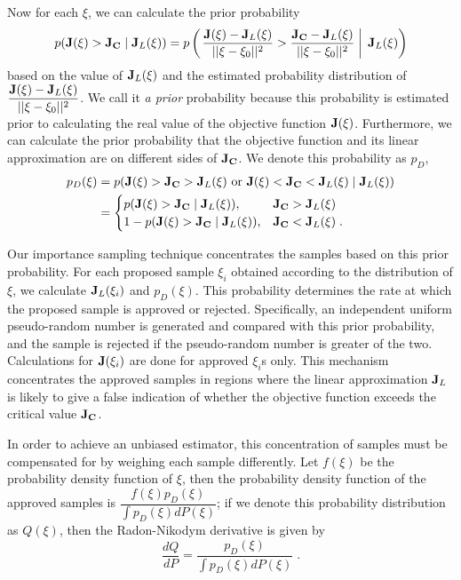 Now for each $\xi$, we can calculate the prior probability
\[ p({\bf J}(\xi) > {\bf J_C} \;|\; {\bf J}_L(\xi))
 = p\left( \left.\dfrac{{\bf J}(\xi) - {\bf J}_L(\xi)}{||\xi - \xi_0||^2}
   > \dfrac{{\bf J_C} - {\bf J}_L(\xi)}{||\xi - \xi_0||^2} \;\right|\;
   {\bf J}_L(\xi) \right) \] 
based on the value of ${\bf J}_L(\xi)$ and the estimated probability
distribution
of $\dfrac{{\bf J}(\xi) - {\bf J}_L(\xi)}{||\xi - \xi_0||^2}$.
We call it {\it a prior}
probability because this probability is estimated prior to
calculating the real value of the objective function ${\bf J}(\xi)$.
Furthermore, we can calculate the prior probability that the objective
function and its linear approximation are on different sides of $\bf J_C$.
We denote this probability as $p_D$,
\[\begin{split}
   p_D(\xi) &= p({\bf J}(\xi) > {\bf J_C} > {\bf J}_L(\xi)
   \mbox{ or } {\bf J}(\xi) < {\bf J_C} < {\bf J}_L(\xi)
   \;|\; {\bf J}_L(\xi)) \\
&= \begin{cases} p({\bf J}(\xi) > {\bf J_C} \;|\; {\bf J}_L(\xi)),
                 & {\bf J_C} > {\bf J}_L(\xi) \\
             1 - p({\bf J}(\xi) > {\bf J_C} \;|\; {\bf J}_L(\xi)),
                 & {\bf J_C} < {\bf J}_L(\xi) \;.
   \end{cases}
\end{split}\]


Our importance sampling technique concentrates the samples based on this
prior probability.  For each proposed sample $\xi_i$ obtained according to the
distribution of $\xi$, we calculate ${\bf J}_L(\xi_i)$ and $ p_D(\xi)$.
This probability determines the rate at which the proposed sample is approved
or rejected.
Specifically, an independent uniform pseudo-random number is generated and
compared with this prior probability, and the sample is rejected if the
pseudo-random number is greater of the two.
Calculations for ${\bf J}(\xi_i)$ are done for approved $\xi_i$s only.
This mechanism concentrates the approved samples in regions where
the linear approximation ${\bf J}_L$ is likely to give a false indication
of whether the objective function exceeds the critical value ${\bf J_C}$.

In order to achieve an unbiased estimator,
this concentration of samples must be compensated for by weighing each sample
differently.  Let $f(\xi)$ be the probability density function of $\xi$,
then the probability density function of the approved samples
is $\dfrac{f(\xi) p_D(\xi)}{\int p_D(\xi) dP(\xi)}$;
if we denote this probability distribution as $Q(\xi)$,
then the Radon-Nikodym derivative is given by
\begin{equation} \label{measure_q}
\frac{dQ}{dP} = \dfrac{p_D(\xi)}{\int p_D(\xi) dP(\xi)} \;.
\end{equation}

